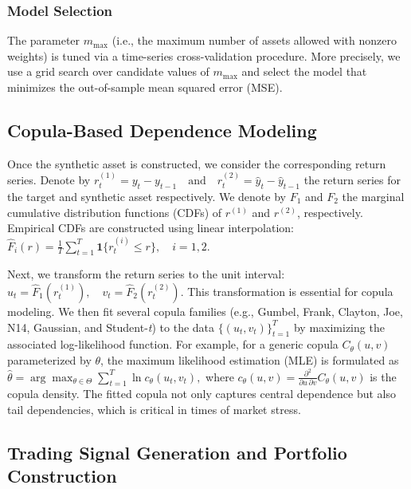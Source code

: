 \subsubsection*{Model Selection}

The parameter $m_{\max}$ (i.e., the maximum number of assets allowed with nonzero weights) is tuned via a time-series cross-validation procedure. More precisely, we use a grid search over candidate values of $m_{\max}$ and select the model that minimizes the out-of-sample mean squared error (MSE).

\subsection{Copula-Based Dependence Modeling}

Once the synthetic asset is constructed, we consider the corresponding return series. Denote by
$
r_t^{(1)} = y_t - y_{t-1} \quad \text{and} \quad r_t^{(2)} = \hat{y}_t - \hat{y}_{t-1}
$
the return series for the target and synthetic asset respectively. We denote by $F_1$ and $F_2$ the marginal cumulative distribution functions (CDFs) of $r^{(1)}$ and $r^{(2)}$, respectively. Empirical CDFs are constructed using linear interpolation:
$
\hat{F}_i(r) = \frac{1}{T}\sum_{t=1}^T \mathbf{1}\{r_t^{(i)} \le r\}, \quad i=1,2.
$

Next, we transform the return series to the unit interval:
$
u_t = \hat{F}_1(r_t^{(1)}), \quad v_t = \hat{F}_2(r_t^{(2)}).
$
This transformation is essential for copula modeling. We then fit several copula families (e.g., Gumbel, Frank, Clayton, Joe,
N14, Gaussian, and Student-\emph{t}) to the data $\{(u_t,v_t)\}_{t=1}^T$ by maximizing the associated log-likelihood function. For example, for a generic copula $C_\theta(u,v)$ parameterized by $\theta$, the maximum likelihood estimation (MLE) is formulated as
$
\hat{\theta} = \arg \max_{\theta \in \Theta} \sum_{t=1}^T \ln c_\theta(u_t,v_t),
$
where $c_\theta(u,v) = \frac{\partial^2}{\partial u\,\partial v} C_\theta(u,v)$ is the copula density. The fitted copula not only captures central dependence but also tail dependencies, which is critical in times of market stress.

\subsection{Trading Signal Generation and Portfolio Construction}

